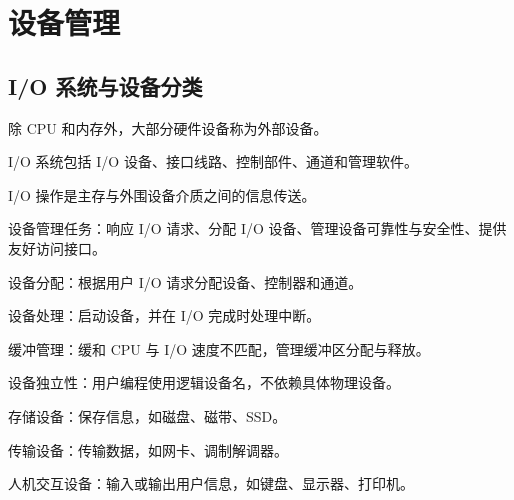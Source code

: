 \chapter{设备管理}

\section{I/O 系统与设备分类}
\begin{points}
  \item 除 CPU 和内存外，大部分硬件设备称为外部设备。
  \item I/O 系统包括 I/O 设备、接口线路、控制部件、通道和管理软件。
  \item I/O 操作是主存与外围设备介质之间的信息传送。
  \item 设备管理任务：响应 I/O 请求、分配 I/O 设备、管理设备可靠性与安全性、提供友好访问接口。
\end{points}


\begin{points}
  \item 设备分配：根据用户 I/O 请求分配设备、控制器和通道。
  \item 设备处理：启动设备，并在 I/O 完成时处理中断。
  \item 缓冲管理：缓和 CPU 与 I/O 速度不匹配，管理缓冲区分配与释放。
  \item 设备独立性：用户编程使用逻辑设备名，不依赖具体物理设备。
\end{points}


\begin{points}
  \item 存储设备：保存信息，如磁盘、磁带、SSD。
  \item 传输设备：传输数据，如网卡、调制解调器。
  \item 人机交互设备：输入或输出用户信息，如键盘、显示器、打印机。
\end{points}


